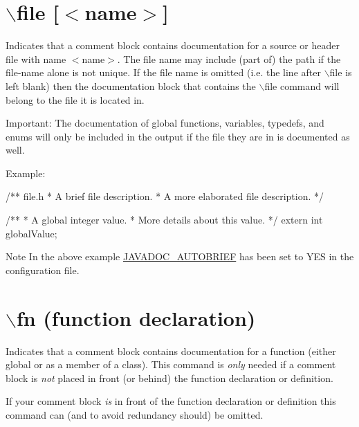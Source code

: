  \hypertarget{commands_cmdfile}{}\section{$\backslash$file \mbox{[}$<$name$>$\mbox{]}}\label{commands_cmdfile}
 Indicates that a comment block contains documentation for a source or header file with name $<$name$>$. The file name may include (part of) the path if the file-\/name alone is not unique. If the file name is omitted (i.e. the line after $\backslash$file is left blank) then the documentation block that contains the $\backslash$file command will belong to the file it is located in.

\begin{DoxyParagraph}{Important:}
The documentation of global functions, variables, typedefs, and enums will only be included in the output if the file they are in is documented as well.
\end{DoxyParagraph}
\begin{DoxyParagraph}{Example:}

\begin{DoxyVerbInclude}
/** \file file.h
 * A brief file description.
 * A more elaborated file description.
 */

/**
 * A global integer value.
 * More details about this value.
 */
extern int globalValue;
\end{DoxyVerbInclude}
 
\end{DoxyParagraph}
\begin{DoxyNote}{Note}
In the above example \hyperlink{config_cfg_javadoc_autobrief}{JAVADOC\_\-AUTOBRIEF} has been set to YES in the configuration file.
\end{DoxyNote}


 \hypertarget{commands_cmdfn}{}\section{$\backslash$fn (function declaration)}\label{commands_cmdfn}
 Indicates that a comment block contains documentation for a function (either global or as a member of a class). This command is {\itshape only\/} needed if a comment block is {\itshape not\/} placed in front (or behind) the function declaration or definition.

If your comment block {\itshape is\/} in front of the function declaration or definition this command can (and to avoid redundancy should) be omitted.

